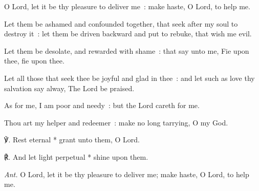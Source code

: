 O Lord, let it be thy pleasure to deliver me~: make haste, O Lord, to help me.\par
{}Let them be ashamed and confounded together, that seek after my soul to destroy it~: let them be driven backward and put to rebuke, that wish me evil.\par
{}Let them be desolate, and rewarded with shame~: that say unto me, Fie upon thee, fie upon thee.\par
{}Let all those that seek thee be joyful and glad in thee~: and let such as love thy salvation say alway, The Lord be praised.\par
{}As for me, I am poor and needy~: but the Lord careth for me.\par
{}Thou art my helper and redeemer~: make no long tarrying, O my God.\par
℣. Rest eternal * grant unto them, O Lord.\par
℟. And let light perpetual * shine upon them.\par\noindent
\textit{Ant.} O Lord, let it be thy pleasure to deliver me; make haste, O Lord, to help me.

